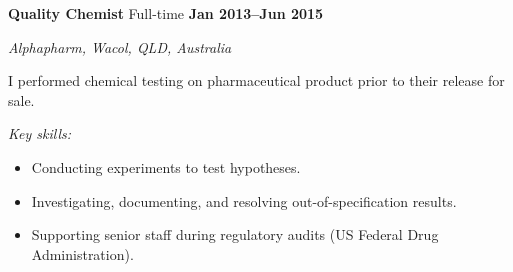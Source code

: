 \textbf{\large Quality Chemist} \hfill Full-time \textbf{Jan 2013--Jun 2015}\par
\textit{Alphapharm, Wacol, QLD, Australia}\par
I performed chemical testing on pharmaceutical product prior to their release for sale.\par
\vspace{1mm}
\textit{Key skills:} \par
\begin{itemize}
	\item Conducting experiments to test hypotheses.
	\item Investigating, documenting, and resolving out-of-specification results.
    \item Supporting senior staff during regulatory audits (US Federal Drug Administration).
\end{itemize}\par